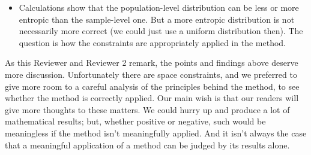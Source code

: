 \documentclass{article}
\begin{document}
\begin{enumerate}
\begin{itemize}
\item Calculations show that the population-level distribution can be less
  or more entropic than the sample-level one. But a more entropic
  distribution is not necessarily more correct (we could just use a uniform
  distribution then). The question is how the constraints are appropriately
  applied in the method. 
\end{itemize}
As this Reviewer and Reviewer 2 remark, the points and findings above
deserve more discussion. Unfortunately there are space constraints, and we
preferred to give more room to a careful analysis of the principles behind
the method, to see whether the method is correctly applied. Our main wish
is that our readers will give more thoughts to these matters. We could
hurry up and produce a lot of mathematical results; but, whether positive or
negative, such would be meaningless if the method isn't meaningfully
applied. And it isn't always the case that a meaningful application of a
method can be judged by its results alone.
\end{enumerate}
\end{document}
